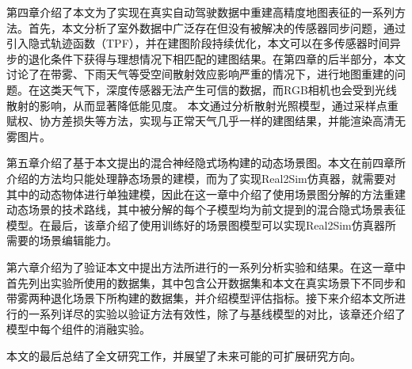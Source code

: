 第四章介绍了本文为了实现在真实自动驾驶数据中重建高精度地图表征的一系列方法。首先，本文分析了室外数据中广泛存在但没有被解决的传感器同步问题，通过引入隐式轨迹函数（TPF），并在建图阶段持续优化，本文可以在多传感器时间异步的退化条件下获得与理想情况下相匹配的建图结果。在第四章的后半部分，本文讨论了在带雾、下雨天气等受空间散射效应影响严重的情况下，进行地图重建的问题。在这类天气下，深度传感器无法产生可信的数据，而RGB相机也会受到光线散射的影响，从而显著降低能见度。 本文通过分析散射光照模型，通过采样点重赋权、协方差损失等方法，实现与正常天气几乎一样的建图结果，并能渲染高清无雾图片。

第五章介绍了基于本文提出的混合神经隐式场构建的动态场景图。本文在前四章所介绍的方法均只能处理静态场景的建模，而为了实现Real2Sim仿真器，就需要对其中的动态物体进行单独建模，因此在这一章中介绍了使用场景图分解的方法重建动态场景的技术路线，其中被分解的每个子模型均为前文提到的混合隐式场景表征模型。在最后，该章介绍了使用训练好的场景图模型可以实现Real2Sim仿真器所需要的场景编辑能力。

第六章介绍为了验证本文中提出方法所进行的一系列分析实验和结果。在这一章中首先列出实验所使用的数据集，其中包含公开数据集和本文在真实场景下不同步和带雾两种退化场景下所构建的数据集，并介绍模型评估指标。接下来介绍本文所进行的一系列详尽的实验以验证方法有效性，除了与基线模型的对比，该章还介绍了模型中每个组件的消融实验。

本文的最后总结了全文研究工作，并展望了未来可能的可扩展研究方向。